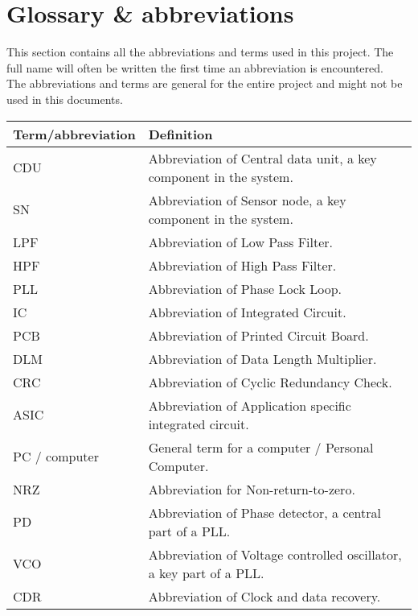 \section{Glossary \& abbreviations}
This section contains all the abbreviations and terms used in this project. The full name will often be written the first time an abbreviation is encountered.\\
The abbreviations and terms are general for the entire project and might not be used in this documents.
\begin{table}[H]
\centering
\begin{tabular}{|p{4cm}|p{7cm}|}
\hline
Term/abbreviation & Definition\\ \hline
CDU & Abbreviation of Central data unit, a key component in the system.\\ \hline
SN & Abbreviation of Sensor node, a key component in the system.\\ \hline
LPF & Abbreviation of Low Pass Filter. \\ \hline
HPF & Abbreviation of High Pass Filter. \\ \hline
PLL & Abbreviation of Phase Lock Loop. \\ \hline
IC & Abbreviation of Integrated Circuit. \\ \hline
PCB & Abbreviation of Printed Circuit Board. \\ \hline
DLM & Abbreviation of Data Length Multiplier. \\ \hline
CRC & Abbreviation of Cyclic Redundancy Check. \\ \hline
ASIC & Abbreviation of Application specific integrated circuit.\\ \hline
PC / computer & General term for a computer / Personal Computer.\\ \hline
NRZ & Abbreviation for Non-return-to-zero.\\ \hline
PD & Abbreviation of Phase detector, a central part of a PLL.\\ \hline
VCO & Abbreviation of Voltage controlled oscillator, a key part of a PLL.\\ \hline
CDR & Abbreviation of Clock and data recovery. \\ \hline
\end{tabular}
\end{table}

